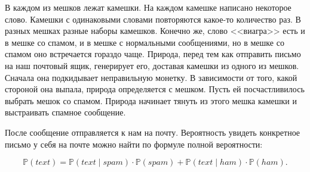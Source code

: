 \documentclass[12pt, a4paper, oneside]{extreport}
\def \mbb{\mathbb}
\def \PP{\mbb{P}}
\theoremstyle{plain}              %
\theoremstyle{definition}         %
\begin{document}
В каждом из мешков лежат камешки. На каждом камешке написано некоторое слово. Камешки с одинаковыми словами повторяются какое-то количество раз. В разных мешках разные наборы камешков. Конечно же, слово <<виагра>> есть и в мешке со спамом, и в мешке с нормальными сообщениями, но  в мешке со спамом оно встречается гораздо чаще.  Природа, перед тем как отправить письмо на наш почтовый ящик, генерирует его, доставая камешки из одного из мешков. Сначала она подкидывает неправильную монетку. В зависимости от того, какой стороной она выпала, природа определяется с мешком. Пусть ей посчастливилось выбрать мешок со спамом.  Природа начинает тянуть из этого мешка камешки и выстраивать спамное сообщение. 

\begin{center}
\end{center}

После сообщение отправляется к нам на почту. Вероятность увидеть конкретное письмо у себя на почте можно найти по формуле полной вероятности: 

\[ \PP(text) = \PP(text \mid spam) \cdot \PP(spam)  + \PP(text \mid ham) \cdot \PP(ham).\] 
\end{document}
